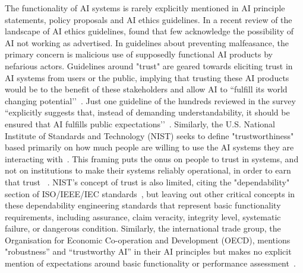 \documentclass[acmconf,manuscript,screen,natbib=true]{acmart}
\begin{document}
The functionality of AI systems is  %
rarely explicitly mentioned in AI principle statements, policy proposals and AI ethics guidelines. In a recent review of the landscape of AI ethics guidelines, \citet{Jobin2019-oa} found that few acknowledge the possibility of AI not working as advertised.
In guidelines about preventing malfeasance, the primary concern is malicious use of supposedly functional AI products by nefarious actors.
Guidelines around "trust" are geared towards eliciting trust in AI systems from users or the public, implying that trusting these AI products would be to the benefit of these stakeholders and allow AI to ``fulfill its world changing potential’’~\cite{Jobin2019-oa}.
Just one guideline of the hundreds reviewed in the survey ``explicitly suggests that, instead of demanding understandability, it should be ensured that AI fulfills public expectations’’~\cite{Jobin2019-oa}.
Similarly, the U.S. National Institute of Standards and Technology (NIST) seeks to define "trustworthiness" based primarily on how much people are willing to use the AI systems they are interacting with~\cite{Stanton2021-oa}. This framing puts the onus on people to trust in systems, and not on institutions to make their systems reliably operational, in order to earn that trust%
~\cite{aclu-comment-trust, noonetrustai-xo}. NIST's concept of trust is also limited, citing the "dependability" section of ISO/IEEE/IEC standards~\cite{ieee_dictionary_dependability}, but leaving out other critical concepts in these dependability engineering standards that represent basic functionality requirements, including assurance, claim veracity, integrity level, systematic failure, or dangerous condition. 
Similarly, the international trade group, the Organisation for Economic Co-operation and Development (OECD), mentions "robustness” and “trustworthy AI” in their AI principles but makes no explicit mention of expectations around basic functionality or performance assessment~\cite{yeung2020recommendation}.%
\end{document}
